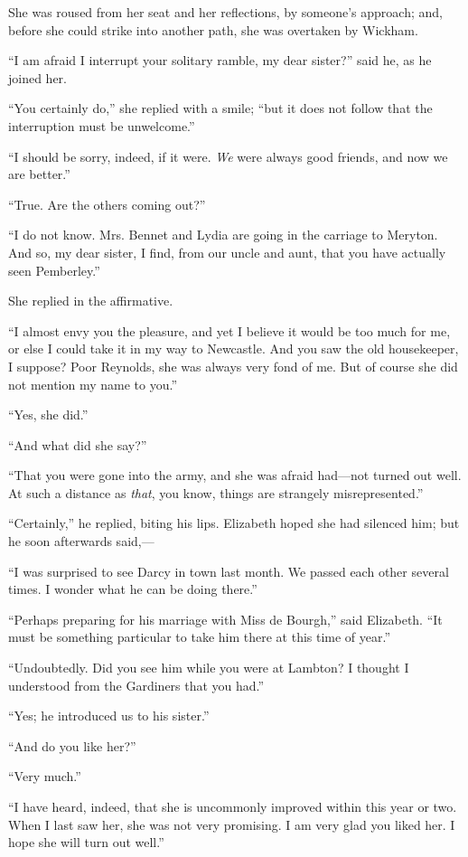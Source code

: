 \documentclass[12pt]{book}
\begin{document}
She was roused from her seat and her reflections, by someone's approach; and, before she could strike into another path, she was overtaken by Wickham.

``I am afraid I interrupt your solitary ramble, my dear sister?'' said he, as he joined her.

``You certainly do,'' she replied with a smile; ``but it does not follow that the interruption must be unwelcome.''

``I should be sorry, indeed, if it were. \textit{We} were always good friends, and now we are better.''

``True. Are the others coming out?''

``I do not know. Mrs. Bennet and Lydia are going in the carriage to Meryton. And so, my dear sister, I find, from our uncle and aunt, that you have actually seen Pemberley.''

She replied in the affirmative.

``I almost envy you the pleasure, and yet I believe it would be too much for me, or else I could take it in my way to Newcastle. And you saw the old housekeeper, I suppose? Poor Reynolds, she was always very fond of me. But of course she did not mention my name to you.''

``Yes, she did.''

``And what did she say?''

``That you were gone into the army, and she was afraid had---not turned out well. At such a distance as \textit{that}, you know, things are strangely misrepresented.''

``Certainly,'' he replied, biting his lips. Elizabeth hoped she had silenced him; but he soon afterwards said,---

``I was surprised to see Darcy in town last month. We passed each other several times. I wonder what he can be doing there.''

``Perhaps preparing for his marriage with Miss de Bourgh,'' said Elizabeth. ``It must be something particular to take him there at this time of year.''

``Undoubtedly. Did you see him while you were at Lambton? I thought I understood from the Gardiners that you had.''

``Yes; he introduced us to his sister.''

``And do you like her?''

``Very much.''

``I have heard, indeed, that she is uncommonly improved within this year or two. When I last saw her, she was not very promising. I am very glad you liked her. I hope she will turn out well.''
\end{document}

